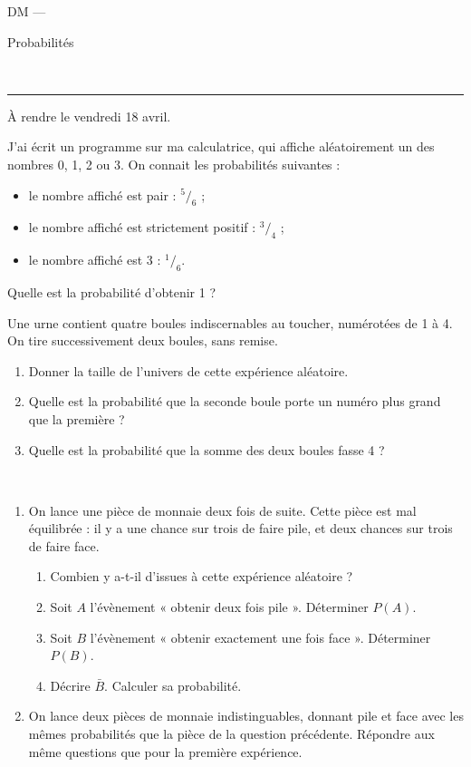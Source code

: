\documentclass[11pt]{article}
\begin{document}
\begin{center}
  \textsc{DM}
  ---
  {
    \Large
    Probabilités

    ~
    \hrule
  }
\end{center}

\begin{em}
  À rendre le vendredi 18 avril.
\end{em}

\begin{exercice}
  J'ai écrit un programme sur ma calculatrice, qui affiche aléatoirement un des nombres 0, 1, 2 ou 3. On connait les probabilités suivantes :
  \begin{itemize}
    \item le nombre affiché est pair : $^5/_6$ ;
    \item le nombre affiché est strictement positif : $^3/_4$ ;
    \item le nombre affiché est 3 : $^1/_6$.
  \end{itemize}
  Quelle est la probabilité d'obtenir 1 ?
\end{exercice}

\begin{exercice}
  Une urne contient quatre boules indiscernables au toucher, numérotées de 1 à 4. On tire successivement deux boules, sans remise.
  \begin{enumerate}
    \item Donner la taille de l'univers de cette expérience aléatoire.
    \item Quelle est la probabilité que la seconde boule porte un numéro plus grand que la première ?
    \item Quelle est la probabilité que la somme des deux boules fasse 4 ?
  \end{enumerate}
\end{exercice}

\begin{exercice}~
  \begin{enumerate}
    \item On lance une pièce de monnaie deux fois de suite. Cette pièce est mal équilibrée : il y a une chance sur trois de faire pile, et deux chances sur trois de faire face.
      \begin{enumerate}
        \item Combien y a-t-il d'issues à cette expérience aléatoire ?
        \item Soit $A$ l'évènement « obtenir deux fois pile ». Déterminer $P(A)$.
        \item Soit $B$ l'évènement « obtenir exactement une fois face ». Déterminer $P(B)$.
        \item Décrire $\bar B$. Calculer sa probabilité.
      \end{enumerate}
    \item On lance deux pièces de monnaie indistinguables, donnant pile et face avec les mêmes probabilités que la pièce de la question précédente. Répondre aux même questions que pour la première expérience.
  \end{enumerate}
\end{exercice}
\end{document}
